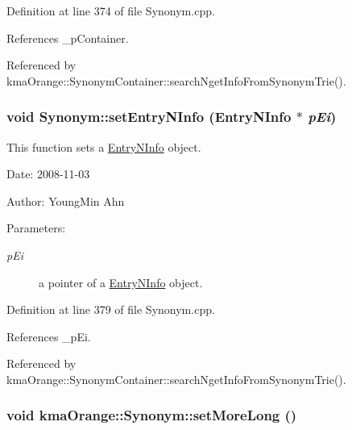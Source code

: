 Definition at line 374 of file Synonym.cpp.

References \_\-pContainer.

Referenced by kmaOrange::SynonymContainer::searchNgetInfoFromSynonymTrie().\hypertarget{classkmaOrange_1_1Synonym_6033a3dc7ea799098a142ac2f2f2f04f}{
\subsubsection[{setEntryNInfo}]{\setlength{\rightskip}{0pt plus 5cm}void Synonym::setEntryNInfo ({\bf EntryNInfo} $\ast$ {\em pEi})}}
\label{classkmaOrange_1_1Synonym_6033a3dc7ea799098a142ac2f2f2f04f}


This function sets a \hyperlink{classkmaOrange_1_1EntryNInfo}{EntryNInfo} object. 

\begin{Desc}
\item[Date:]2008-11-03 \end{Desc}
\begin{Desc}
\item[Author:]YoungMin Ahn \end{Desc}
\begin{Desc}
\item[Parameters:]
\begin{description}
\item[{\em pEi}]a pointer of a \hyperlink{classkmaOrange_1_1EntryNInfo}{EntryNInfo} object. \end{description}
\end{Desc}


Definition at line 379 of file Synonym.cpp.

References \_\-pEi.

Referenced by kmaOrange::SynonymContainer::searchNgetInfoFromSynonymTrie().\hypertarget{classkmaOrange_1_1Synonym_ddb51b0a9b2074e9ff7d2bb3640ee1eb}{
\subsubsection[{setMoreLong}]{\setlength{\rightskip}{0pt plus 5cm}void kmaOrange::Synonym::setMoreLong ()}}
\label{classkmaOrange_1_1Synonym_ddb51b0a9b2074e9ff7d2bb3640ee1eb}


